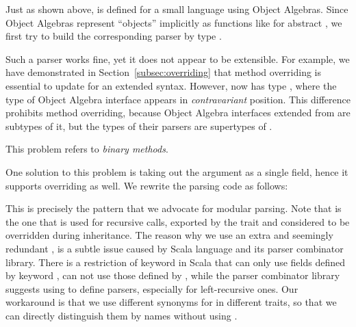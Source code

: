 Just as shown above,  is defined for a small language using Object Algebras. Since Object Algebras represent ``objects'' implicitly as functions like   for abstract , we first try to build the corresponding parser by type  .

Such a parser works fine, yet it does not appear to be extensible. For example, we have demonstrated in Section~\ref{subsec:overriding} that method overriding is essential to update  for an extended syntax. However, now  has type  , where the type of Object Algebra interface appears in \emph{contravariant} position. This difference prohibits method overriding, because Object Algebra interfaces extended from  are subtypes of it, but the types of their parsers are supertypes of  .

This problem refers to \textit{binary methods}. 

One solution to this problem is taking out the argument as a single field, hence it supports overriding as well. We rewrite the parsing code as follows:

This is precisely the pattern that we advocate for modular parsing. Note that  is the one that is used for recursive calls, exported by the trait and considered to be overridden during inheritance. The reason why we use an extra and seemingly redundant , is a subtle issue caused by Scala language and its parser combinator library. There is a restriction of  keyword in Scala that  can only use fields defined by keyword , can not use those defined by , while the parser combinator library suggests using  to define parsers, especially for left-recursive ones. Our workaround is that we use different synonyms for  in different traits, so that we can directly distinguish them by names without using .

